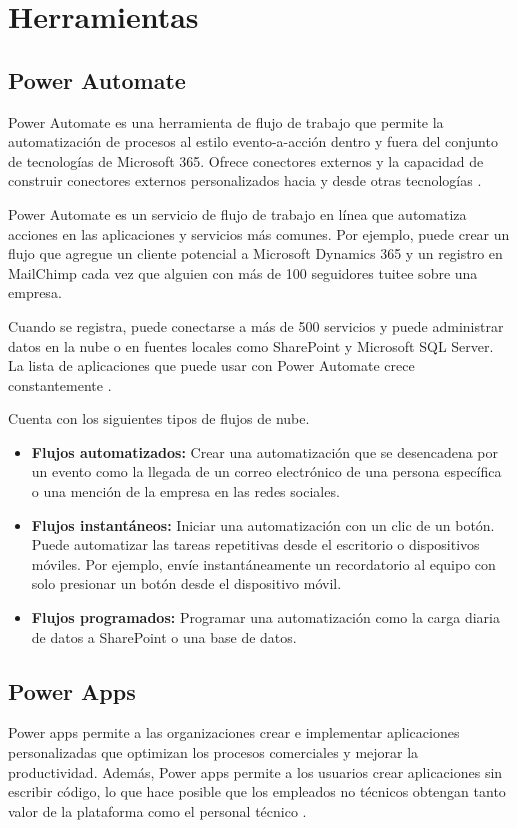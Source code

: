 \section{Herramientas}
\subsection{Power Automate}
Power Automate es una herramienta de flujo de trabajo que permite la automatización de procesos al estilo
evento-a-acción dentro y fuera del conjunto de tecnologías de Microsoft 365. Ofrece conectores externos y la capacidad de
construir conectores externos personalizados hacia y desde otras tecnologías \citet{Critchley2020}.

Power Automate es un servicio de flujo de trabajo en línea que automatiza acciones en las aplicaciones y servicios más comunes. Por ejemplo, puede crear un flujo que agregue un cliente potencial a Microsoft Dynamics 365 y un registro en MailChimp cada vez que alguien con más de 100 seguidores tuitee sobre una empresa.

Cuando se registra, puede conectarse a más de 500 servicios y puede administrar datos en la nube o en fuentes locales como SharePoint y Microsoft SQL Server. La lista de aplicaciones que puede usar con Power Automate crece constantemente \citep{MicrosoftLearn}.

Cuenta con los siguientes tipos de flujos de nube.

\begin{itemize}
	\item \textbf{Flujos automatizados:}	Crear una automatización que se desencadena por un evento como la llegada de un correo electrónico de una persona específica o una mención de la empresa en las redes sociales.
	\item \textbf{Flujos instantáneos:}	Iniciar una automatización con un clic de un botón. Puede automatizar las tareas repetitivas desde el escritorio o dispositivos móviles. Por ejemplo, envíe instantáneamente un recordatorio al equipo con solo presionar un botón desde el dispositivo móvil.
	\item \textbf{Flujos programados:}	Programar una automatización como la carga diaria de datos a SharePoint o una base de datos.
\end{itemize}

\subsection{Power Apps}
Power apps permite a las organizaciones crear e implementar aplicaciones personalizadas que optimizan los
procesos comerciales y mejorar la productividad. Además, Power apps permite a los usuarios crear aplicaciones sin escribir
código, lo que hace posible que los empleados no técnicos obtengan tanto valor de la plataforma como el personal técnico \citep{Pearson2020}.
